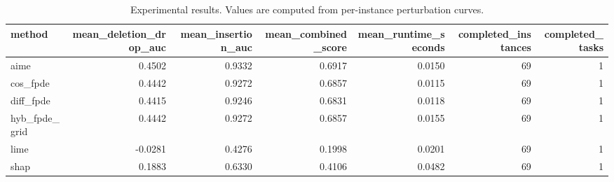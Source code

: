 \begin{table}[t]
\caption{Experimental results. Values are computed from per-instance perturbation curves.}
\label{tab:main_results_computed}
\centering
\begin{tabular}{lrrrrrr}
\toprule
method & mean\_deletion\_drop\_auc & mean\_insertion\_auc & mean\_combined\_score & mean\_runtime\_seconds & completed\_instances & completed\_tasks \\
\midrule
aime & 0.4502 & 0.9332 & 0.6917 & 0.0150 & 69 & 1 \\
cos\_fpde & 0.4442 & 0.9272 & 0.6857 & 0.0115 & 69 & 1 \\
diff\_fpde & 0.4415 & 0.9246 & 0.6831 & 0.0118 & 69 & 1 \\
hyb\_fpde\_grid & 0.4442 & 0.9272 & 0.6857 & 0.0155 & 69 & 1 \\
lime & -0.0281 & 0.4276 & 0.1998 & 0.0201 & 69 & 1 \\
shap & 0.1883 & 0.6330 & 0.4106 & 0.0482 & 69 & 1 \\
\bottomrule
\end{tabular}

\end{table}

